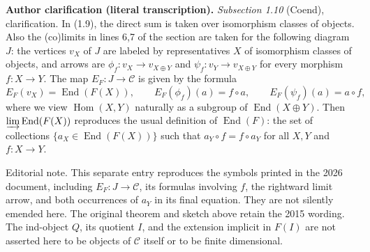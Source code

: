 \documentclass[11pt]{article}
\newcommand{\cC}{\mathcal{C}}
\newcommand{\End}{\operatorname{End}}
\newcommand{\Hom}{\operatorname{Hom}}
\newcommand{\editorial}[1]{\par\smallskip\noindent\textsf{Editorial note.} #1\par\smallskip}
\begin{document}
\medskip
\noindent\textbf{Author clarification (literal transcription).}
\emph{Subsection 1.10} (Coend), clarification. In (1.9), the direct sum is
taken over isomorphism classes of objects. Also the (co)limits in lines 6,7
of the section are taken for the following diagram $J$: the vertices $v_X$
of $J$ are labeled by representatives $X$ of isomorphism classes of objects,
and arrows are $\phi_f:v_X\to v_{X\oplus Y}$ and
$\psi_f:v_Y\to v_{X\oplus Y}$ for every morphism $f:X\to Y$.
The map $E_F:J\to\cC$ is given by the formula
\[
E_F(v_X)=\End(F(X)),\qquad
E_F(\phi_f)(a)=f\circ a,\qquad E_F(\psi_f)(a)=a\circ f,
\]
where we view $\Hom(X,Y)$ naturally as a subgroup of $\End(X\oplus Y)$.
Then $\varinjlim\End(F(X))$ reproduces the usual definition of $\End(F)$:
the set of collections $\{a_X\in\End(F(X))\}$ such that
$a_Y\circ f=f\circ a_Y$ for all $X,Y$ and $f:X\to Y$.

\editorial{This separate entry reproduces the symbols printed in the 2026
document, including $E_F:J\to\cC$, its formulas involving $f$, the
rightward limit arrow, and both occurrences of $a_Y$ in its final equation.
They are not silently emended here. The original theorem and sketch above
retain the 2015 wording. The ind-object $Q$, its quotient $I$, and the
extension implicit in $F(I)$ are not asserted here to be objects of
$\cC$ itself or to be finite dimensional.}
\end{document}
